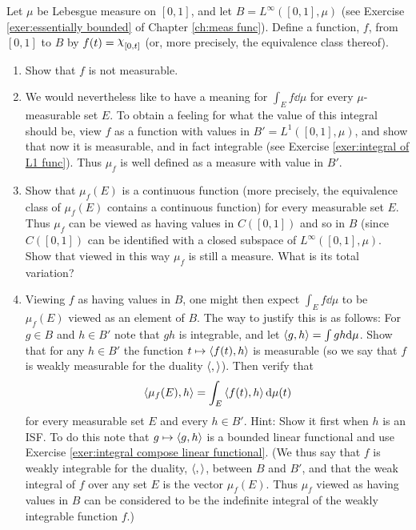 \begin{enumerate}[label=\arabic*),ref=\arabic*]
Let $\mu$ be Lebesgue measure on $[0,1]$, and let $B=L^\infty([0,1],\mu)$ (see Exercise \ref{exer:essentially bounded} of Chapter \ref{ch:meas func}). Define a function, $f$, from $[0,1]$ to $B$ by $f(t)=\idf{[0,t]}$ (or, more precisely, the equivalence class thereof).

\begin{enumerate}[label=\alph*),ref=\theenumi\alph*)]
    \item Show that $f$ is not measurable.

    \item We would nevertheless like to have a meaning for $\int_Ef\dd\mu$ for every $\mu$-measurable set $E$. To obtain a feeling for what the value of this integral should be, view $f$ as a function with values in $B'=L^1([0,1],\mu)$, and show that now it is measurable, and in fact integrable (see Exercise \ref{exer:integral of L1 func}). Thus $\mu_f$ is well defined as a measure with value in $B'$.

    \item Show that $\mu_f(E)$ is a continuous function (more precisely, the equivalence class of $\mu_f(E)$ contains a continuous function) for every measurable set $E$. Thus $\mu_f$ can be viewed as having values in $C([0,1])$ and so in $B$ (since $C([0,1])$ can be identified with a closed subspace of $L^\infty([0,1],\mu)$. Show that viewed in this way $\mu_f$ is still a measure. What is its total variation?

    \item\label{exer:item:integral w duality}
    Viewing $f$ as having values in $B$, one might then expect $\int_Ef\dd\mu$ to be $\mu_f(E)$ viewed as an element of $B$. The way to justify this is as follows: For $g \in B$ and $h\in B'$ note that $gh$ is integrable, and let $\left\langle g,h\right\rangle=\int gh\dd\mu$. Show that for any $h\in B'$ the function $t\mapsto\left\langle f(t), h\right\rangle$ is measurable (so we say that $f$ is weakly measurable for the duality $\left\langle,\right\rangle$). Then verify that $$\left\langle\mu_f(E),h\right\rangle=\int_E\left\langle f(t),h\right\rangle\dd\mu(t)$$ for every measurable set $E$ and every $h \in B'$. Hint: Show it first when $h$ is an ISF. To do this note that $g\mapsto\left\langle g,h\right\rangle$ is a bounded linear functional and use Exercise \ref{exer:integral compose linear functional}. (We thus say that $f$ is weakly integrable for the duality, $\left\langle,\right\rangle$, between $B$ and $B'$, and that the weak integral of $f$ over any set $E$ is the vector $\mu_f(E)$. Thus $\mu_f$ viewed as having values in $B$ can be considered to be the indefinite integral of the weakly integrable function $f$.)
    

\end{enumerate}
\end{enumerate}
